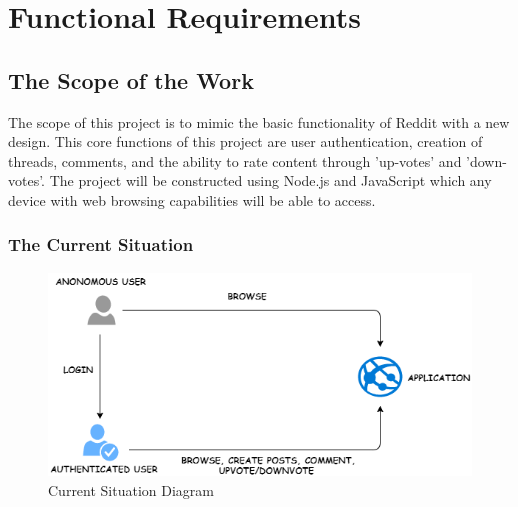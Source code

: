 \documentclass[12pt,fleqn]{article}
\begin{document}
\pagebreak


\section {Functional Requirements}

\subsection {The Scope of the Work}
The scope of this project is to mimic the basic functionality of Reddit with a new design. This core functions of this project are user authentication, creation of threads, comments, and the ability to rate content through ’up-votes’ and ’down-votes’. The project will be constructed using Node.js and JavaScript which any device with web browsing capabilities will be able to access.

\subsubsection{The Current Situation}

\begin{figure}[htp]
\centering
\includegraphics[width=19cm]{situation}
\caption{Current Situation Diagram}
\label{fig:env}
\end{figure}
\end{document}

